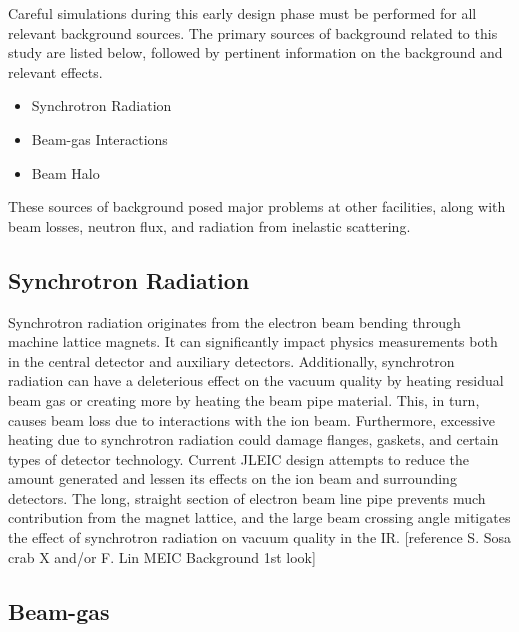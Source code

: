 
Careful simulations during this early design phase must be performed for all relevant background sources.  The primary sources of background related to this study are listed below, followed by pertinent information on the background and relevant effects.
\begin{itemize}
	\item Synchrotron Radiation
	\item Beam-gas Interactions
	\item Beam Halo
\end{itemize}

These sources of background posed major problems at other facilities, along with beam losses, neutron flux, and radiation from inelastic scattering.

\subsection{Synchrotron Radiation}

Synchrotron radiation originates from the electron beam bending through machine lattice magnets.  It can significantly impact physics measurements both in the central detector and auxiliary detectors.  Additionally, synchrotron radiation can have a deleterious effect on the vacuum quality by heating residual beam gas or creating more by heating the beam pipe material.  This, in turn, causes beam loss due to interactions with the ion beam.  Furthermore, excessive heating due to synchrotron radiation could damage flanges, gaskets, and certain types of detector technology.
Current JLEIC design attempts to reduce the amount generated and lessen its effects on the ion beam and surrounding detectors.  The long, straight section of electron beam line pipe prevents much contribution from the magnet lattice, and the large beam crossing angle mitigates the effect of synchrotron radiation on vacuum quality in the IR. [reference S. Sosa crab X and/or F. Lin MEIC Background 1st look]

\subsection{Beam-gas}

